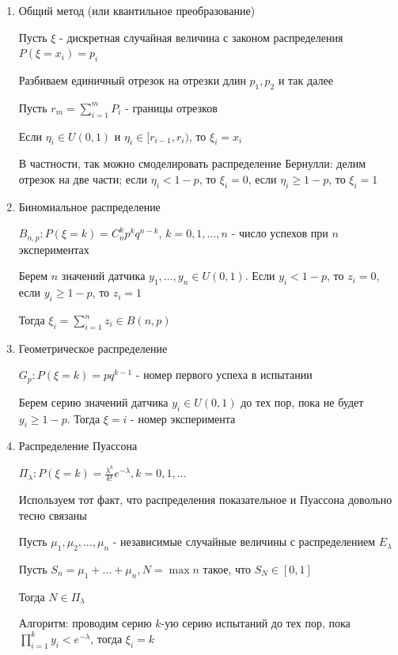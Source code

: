 \documentclass[12pt]{article}
\begin{document}
\begin{enumerate}[label*=\Roman*. ]
    \item Общий метод (или квантильное преобразование)

    Пусть $\xi$ - дискретная случайная величина с законом распределения $P(\xi = x_i) = p_i$

    Разбиваем единичный отрезок на отрезки длин $p_1, p_2$ и так далее

    Пусть $r_m = \sum_{i = 1}^m P_i$ - границы отрезков

    Если $\eta_i \in U(0, 1)$ и $\eta_i \in [r_{i-1}, r_{i})$, то $\xi_i = x_i$

    В частности, так можно смоделировать распределение Бернулли: делим отрезок на две части; если $\eta_i < 1 - p$, то $\xi_i = 0$, если $\eta_i \geq 1 - p$, то $\xi_i = 1$

    \item Биномиальное распределение

    $B_{n,p}: P(\xi = k) = C_n^k p^k q^{n - k}$, $k = 0, 1, \dots, n$ - число успехов при $n$ экспериментах
    
    Берем $n$ значений датчика $y_1, \dots, y_n \in U(0, 1)$. Если $y_i < 1 - p$, то $z_i = 0$, если $y_i \geq 1 - p$, то $z_i = 1$

    Тогда $\xi_i = \sum_{i = 1}^n z_i \in B(n, p)$

    \item Геометрическое распределение

    $G_p: P(\xi = k) = p q^{k - 1}$ - номер первого успеха в испытании

    Берем серию значений датчика $y_i \in U(0, 1)$ до тех пор, пока не будет $y_i \geq 1 - p$. Тогда $\xi = i$ - номер эксперимента

    \item Распределение Пуассона

    $\Pi_\lambda: P(\xi = k) = \frac{\lambda^k}{k!} e^{-\lambda}, k = 0, 1, \dots$

    Используем тот факт, что распределения показательное и Пуассона довольно тесно связаны

    \begin{MyTheorem}
        \Ths Пусть $\mu_1, \mu_2, \dots, \mu_n$ - независимые случайные величины с распределением $E_\lambda$

        Пусть $S_n = \mu_1 + \dots + \mu_n, N = \max n$ такое, что $S_N \in [0, 1]$

        Тогда $N \in \Pi_\lambda$
    \end{MyTheorem}

    Алгоритм: проводим серию $k$-ую серию испытаний до тех пор, пока $\prod^k_{i = 1} y_i < e^{-\lambda}$, тогда $\xi_i = k$

\end{enumerate}
\end{document}
